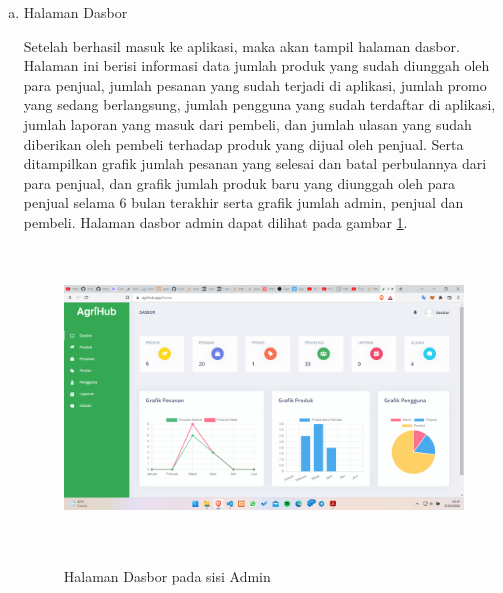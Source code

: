\begin{enumerate}
\begin{enumerate}[a.]
		\newpage
		\item Halaman Dasbor
		\par Setelah berhasil masuk ke aplikasi, maka akan tampil halaman dasbor. Halaman ini berisi informasi data jumlah produk yang sudah diunggah oleh para penjual, jumlah pesanan yang sudah terjadi di aplikasi, jumlah promo yang sedang berlangsung, jumlah pengguna yang sudah terdaftar di aplikasi, jumlah laporan yang masuk dari pembeli, dan jumlah ulasan yang sudah diberikan oleh pembeli terhadap produk yang dijual oleh penjual. Serta ditampilkan grafik jumlah pesanan yang selesai dan batal perbulannya dari para penjual, dan grafik jumlah produk baru yang diunggah oleh para penjual selama 6 bulan terakhir serta grafik jumlah admin, penjual dan pembeli. Halaman dasbor admin dapat dilihat pada gambar \ref*{dashboard_admin}.
		\begin{figure}[H]
			\centering
			{\includegraphics [width = 13.3cm, height= 8cm]{gambar/admin/dashboard_admin}}
			\caption{Halaman Dasbor pada sisi Admin}
			\label{dashboard_admin}
		\end{figure}


\end{enumerate}
\end{enumerate}
